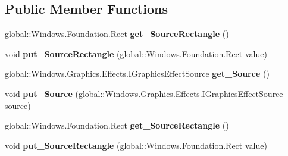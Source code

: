 \subsection*{Public Member Functions}
\begin{DoxyCompactItemize}
\item 
\mbox{\label{interface_microsoft_1_1_graphics_1_1_canvas_1_1_effects_1_1_i_tile_effect_a9987fc9d39e785ca4580a828c0e585b6}} 
global\+::\+Windows.\+Foundation.\+Rect {\bfseries get\+\_\+\+Source\+Rectangle} ()
\item 
\mbox{\label{interface_microsoft_1_1_graphics_1_1_canvas_1_1_effects_1_1_i_tile_effect_a0b1dc0ce9ccf89dff8028193fabe0e72}} 
void {\bfseries put\+\_\+\+Source\+Rectangle} (global\+::\+Windows.\+Foundation.\+Rect value)
\item 
\mbox{\label{interface_microsoft_1_1_graphics_1_1_canvas_1_1_effects_1_1_i_tile_effect_a0342b675b2b69f003523489bb2794c0b}} 
global\+::\+Windows.\+Graphics.\+Effects.\+I\+Graphics\+Effect\+Source {\bfseries get\+\_\+\+Source} ()
\item 
\mbox{\label{interface_microsoft_1_1_graphics_1_1_canvas_1_1_effects_1_1_i_tile_effect_a0ef03014fc410a579000361d151b047c}} 
void {\bfseries put\+\_\+\+Source} (global\+::\+Windows.\+Graphics.\+Effects.\+I\+Graphics\+Effect\+Source source)
\item 
\mbox{\label{interface_microsoft_1_1_graphics_1_1_canvas_1_1_effects_1_1_i_tile_effect_a9987fc9d39e785ca4580a828c0e585b6}} 
global\+::\+Windows.\+Foundation.\+Rect {\bfseries get\+\_\+\+Source\+Rectangle} ()
\item 
\mbox{\label{interface_microsoft_1_1_graphics_1_1_canvas_1_1_effects_1_1_i_tile_effect_a0b1dc0ce9ccf89dff8028193fabe0e72}} 
void {\bfseries put\+\_\+\+Source\+Rectangle} (global\+::\+Windows.\+Foundation.\+Rect value)
\item 

\end{DoxyCompactItemize}
